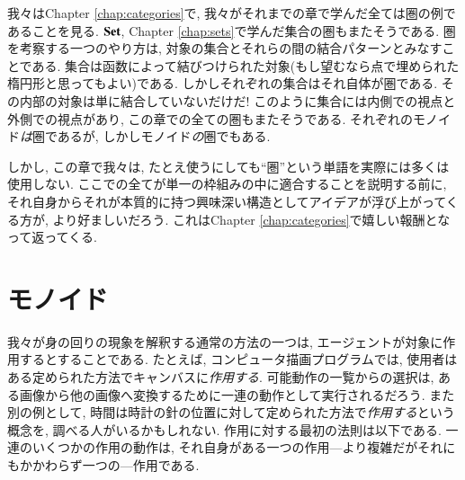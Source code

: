 我々はChapter \ref{chap:categories}で, 我々がそれまでの章で学んだ全ては圏の例であることを見る. $\mathbf{Set}$, Chapter \ref{chap:sets}で学んだ集合の圏もまたそうである. 圏を考察する一つのやり方は, 対象の集合とそれらの間の結合パターンとみなすことである. 集合は函数によって結びつけられた対象(もし望むなら点で埋められた楕円形と思ってもよい)である. しかしそれぞれの集合はそれ自体が圏である. その内部の対象は単に結合していないだけだ! このように集合には内側での視点と外側での視点があり, この章での全ての圏もまたそうである. それぞれのモノイド\emph{は}圏であるが, しかしモノイド\emph{の}圏でもある.


しかし, この章で我々は, たとえ使うにしても``圏''という単語を実際には多くは使用しない. ここでの全てが単一の枠組みの中に適合することを説明する前に, それ自身からそれが本質的に持つ興味深い構造としてアイデアが浮び上がってくる方が, より好ましいだろう. これはChapter \ref{chap:categories}で嬉しい報酬となって返ってくる.


\section{モノイド}\label{sec:monoids}


我々が身の回りの現象を解釈する通常の方法の一つは, エージェントが対象に作用するとすることである. たとえば, コンピュータ描画プログラムでは, 使用者はある定められた方法でキャンバスに\emph{作用する}. 可能動作の一覧からの選択は, ある画像から他の画像へ変換するために一連の動作として実行されるだろう. また別の例として, 時間は時計の針の位置に対して定められた方法で\emph{作用する}という概念を, 調べる人がいるかもしれない. 作用に対する最初の法則は以下である. 一連のいくつかの作用の動作は, それ自身がある一つの作用---より複雑だがそれにもかかわらず一つの---作用である.

